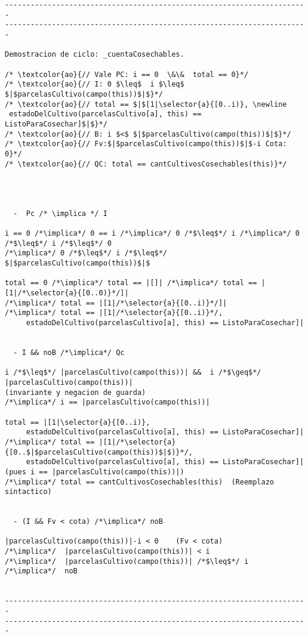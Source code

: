 \begin{lstlisting}
-----------------------------------------------------------------------
-----------------------------------------------------------------------

Demostracion de ciclo: _cuentaCosechables.

/* \textcolor{ao}{// Vale PC: i == 0  \&\&  total == 0}*/
/* \textcolor{ao}{// I: 0 $\leq$  i $\leq$ $|$parcelasCultivo(campo(this))$|$}*/
/* \textcolor{ao}{// total == $|$[1|\selector{a}{[0..i)}, \newline
 estadoDelCultivo(parcelasCultivo[a], this) == ListoParaCosechar]$|$}*/
/* \textcolor{ao}{// B: i $<$ $|$parcelasCultivo(campo(this))$|$}*/
/* \textcolor{ao}{// Fv:$|$parcelasCultivo(campo(this))$|$-i Cota: 0}*/
/* \textcolor{ao}{// QC: total == cantCultivosCosechables(this)}*/    




  -  Pc /* \implica */ I
  
i == 0 /*\implica*/ 0 == i /*\implica*/ 0 /*$\leq$*/ i /*\implica*/ 0 /*$\leq$*/ i /*$\leq$*/ 0 
/*\implica*/ 0 /*$\leq$*/ i /*$\leq$*/ $|$parcelasCultivo(campo(this))$|$

total == 0 /*\implica*/ total == |[]| /*\implica*/ total == |[1|/*\selector{a}{[0..0)}*/]|
/*\implica*/ total == |[1|/*\selector{a}{[0..i)}*/]| 
/*\implica*/ total == |[1|/*\selector{a}{[0..i)}*/, 
     estadoDelCultivo(parcelasCultivo[a], this) == ListoParaCosechar]|


  - I && noB /*\implica*/ Qc
  
i /*$\leq$*/ |parcelasCultivo(campo(this))| &&  i /*$\geq$*/ |parcelasCultivo(campo(this))| 
(invariante y negacion de guarda)
/*\implica*/ i == |parcelasCultivo(campo(this))|

total == |[1|\selector{a}{[0..i)}, 
     estadoDelCultivo(parcelasCultivo[a], this) == ListoParaCosechar]|
/*\implica*/ total == |[1|/*\selector{a}{[0..$|$parcelasCultivo(campo(this))$|$)}*/,
     estadoDelCultivo(parcelasCultivo[a], this) == ListoParaCosechar]|
(pues i == |parcelasCultivo(campo(this))|)
/*\implica*/ total == cantCultivosCosechables(this)  (Reemplazo sintactico)


  - (I && Fv < cota) /*\implica*/ noB

|parcelasCultivo(campo(this))|-i < 0    (Fv < cota)
/*\implica*/  |parcelasCultivo(campo(this))| < i    
/*\implica*/  |parcelasCultivo(campo(this))| /*$\leq$*/ i
/*\implica*/  noB


-----------------------------------------------------------------------
-----------------------------------------------------------------------


\end{lstlisting}
